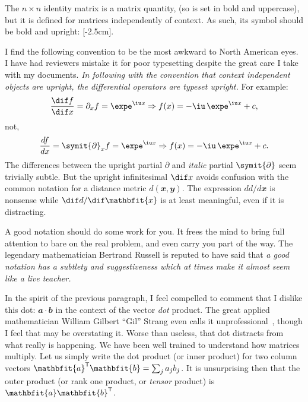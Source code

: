 The $n\times n$ identity matrix is a matrix quantity, (so is set in bold and
uppercase), but it is defined for matrices independently of context. As such,
its symbol should be bold and upright: [-2.5cm].

I find the following convention to be the most awkward to North American eyes. I
have had reviewers mistake it for poor typesetting despite the great care I take
with my documents. \textit{In following with the convention that context
independent objects are upright, the differential operators are typeset
upright.}\/ For example:
\[
  \diff{f}{x} = \partial_x f = \expe^{\iu x}  \implies f(x) = -\iu\,\expe^{\iu x}+c,
\]
not,
\[
  \frac{df}{dx} = \symit{\partial}_x f = \expe^{\iu x}  \implies f(x) = -\iu\,\expe^{\iu x}+c.
\]
The differences between the upright partial $\partial$ and \textit{italic}
partial $\symit{\partial}$ seem trivially subtle. But the upright infinitesimal
$\dif x$ avoids confusion with the common notation for a distance metric
$d(\mathbfit{x}, \mathbfit{y})$. The expression $d d/d\mathbfit{x}$ is nonsense
while $\dif d/\dif\mathbfit{x}$ is at least meaningful, even if it is
distracting.

A good notation should do some work for you. It frees the mind to bring full
attention to bare on the real problem, and even carry you part of the way. The
legendary mathematician Bertrand Russell is reputed to have said that \textit{a
good notation has a subtlety and suggestiveness which at times make it almost
seem like a live teacher.}

In the spirit of the previous paragraph, I feel compelled to comment that I
dislike this dot: $\mathbfit{a}\cdot\mathbfit{b}$ in the context of the vector
\emph{dot} product. The great applied mathematician William Gilbert ``Gil''
Strang even calls it unprofessional~\cite[p.~108]{Strang09}, though I feel that
may be overstating it. Worse than useless, that dot distracts from what really
is happening. We have been well trained to understand how matrices multiply. Let
us simply write the dot product (or inner
product) for two column vectors
$\mathbfit{a}\tr\mathbfit{b} = \sum_j a_j b_j$. It is unsurprising then that the
outer product (or rank one product, or \textit{tensor} product) is
$\mathbfit{a}\mathbfit{b}\tr$.

